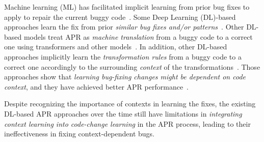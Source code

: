 Machine learning (ML)
has facilitated implicit learning from prior bug fixes to apply to repair
the current buggy
code~\cite{long2016automatic,long2017automatic,saha2017elixir}.
Some Deep Learning (DL)-based approaches learn the fix from prior {\em
  similar bug fixes and/or
  patterns}~\cite{gupta2017deepfix,white2019sorting,white2016deep}.
Other DL-based models treat APR as {\em machine translation} from a
buggy code to a correct one using transformers and other
models~\cite{chakrabortycodit,chen2018sequencer,hata2018learning,tufano2018empirical,see2017get}.
In addition, other DL-based approaches implicitly learn the {\em
  transformation rules} from a buggy code to a correct one accordingly
to the surrounding {\em context} of the
transformations~\cite{chen2018sequencer,icse20,cure-icse21,lutellier2020coconut}.
Those approaches show that {\em learning bug-fixing changes might be
  dependent on {\em code context}}, and they 
have achieved better APR
performance~\cite{icse20,lutellier2020coconut,cure-icse21}.


Despite recognizing the importance of contexts in learning the fixes,
the existing DL-based APR approaches over the time still have
limitations in {\em integrating context learning into code-change
  learning} in the APR process, leading to their ineffectiveness in
fixing context-dependent bugs.

